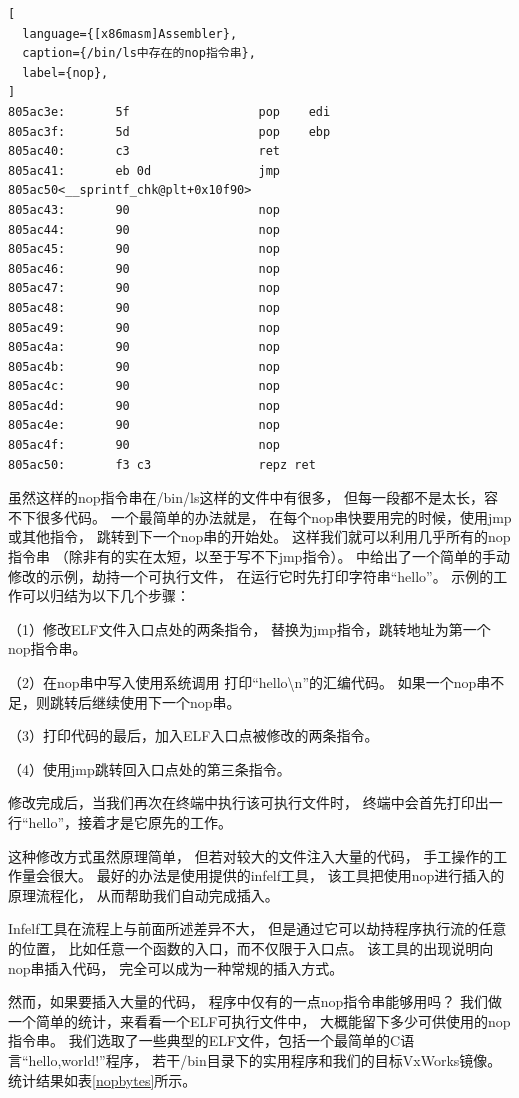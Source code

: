 \begin{lstlisting}[
  language={[x86masm]Assembler},
  caption={/bin/ls中存在的nop指令串},
  label={nop},
]
805ac3e:       5f                  pop    edi
805ac3f:       5d                  pop    ebp
805ac40:       c3                  ret
805ac41:       eb 0d               jmp    805ac50<__sprintf_chk@plt+0x10f90>
805ac43:       90                  nop
805ac44:       90                  nop
805ac45:       90                  nop
805ac46:       90                  nop
805ac47:       90                  nop
805ac48:       90                  nop
805ac49:       90                  nop
805ac4a:       90                  nop
805ac4b:       90                  nop
805ac4c:       90                  nop
805ac4d:       90                  nop
805ac4e:       90                  nop
805ac4f:       90                  nop
805ac50:       f3 c3               repz ret
\end{lstlisting}

虽然这样的nop指令串在/bin/ls这样的文件中有很多，
但每一段都不是太长，容不下很多代码。
一个最简单的办法就是，
在每个nop串快要用完的时候，使用jmp或其他指令，
跳转到下一个nop串的开始处。
这样我们就可以利用几乎所有的nop指令串
（除非有的实在太短，以至于写不下jmp指令）。
\cite{heike}中给出了一个简单的手动修改的示例，劫持一个可执行文件，
在运行它时先打印字符串“hello”。
示例的工作可以归结为以下几个步骤：

（1）修改ELF文件入口点处的两条指令，
替换为jmp指令，跳转地址为第一个nop指令串。

（2）在nop串中写入使用系统调用
打印“hello\textbackslash n”的汇编代码。
如果一个nop串不足，则跳转后继续使用下一个nop串。

（3）打印代码的最后，加入ELF入口点被修改的两条指令。

（4）使用jmp跳转回入口点处的第三条指令。

修改完成后，当我们再次在终端中执行该可执行文件时，
终端中会首先打印出一行“hello”，接着才是它原先的工作。

这种修改方式虽然原理简单，
但若对较大的文件注入大量的代码，
手工操作的工作量会很大。
最好的办法是使用\cite{infelf}提供的infelf工具，
该工具把使用nop进行插入的原理流程化，
从而帮助我们自动完成插入。

Infelf工具在流程上与前面所述差异不大，
但是通过它可以劫持程序执行流的任意的位置，
比如任意一个函数的入口，而不仅限于入口点。
该工具的出现说明向nop串插入代码，
完全可以成为一种常规的插入方式。

然而，如果要插入大量的代码，
程序中仅有的一点nop指令串能够用吗？
我们做一个简单的统计，来看看一个ELF可执行文件中，
大概能留下多少可供使用的nop指令串。
我们选取了一些典型的ELF文件，包括一个最简单的C语言“hello,world!”程序，
若干/bin目录下的实用程序和我们的目标VxWorks镜像。
统计结果如表\ref{nopbytes}所示。

